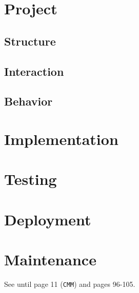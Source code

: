 \documentclass{llncs}
\newcommand{\labelsec}[1]{\label{sec:#1}}
\begin{document}
\section{Project}
\labelsec{Project}

\subsection{Structure}
\subsection{Interaction}
\subsection{Behavior}

\section{Implementation}
\labelsec{Implementation}

\section{Testing}
\labelsec{testing}

\section{Deployment}
\labelsec{Deployment}

\section{Maintenance}
\labelsec{Maintenance}
\newpage
See \cite{natMol09} until page 11 (\texttt{CMM}) and pages 96-105.
\end{document}
